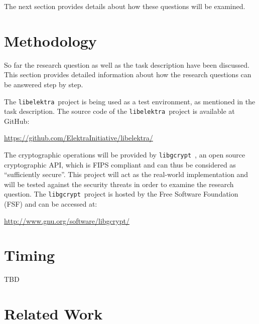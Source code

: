 \documentclass[a4paper,12pt]{article}
\newcommand{\libelektra}{\texttt{libelektra}~}
\newcommand{\libgcrypt}{\texttt{libgcrypt}~}
\begin{document}
The next section provides details about how these questions will be examined.


\section{Methodology}

So far the research question as well as the task description have been discussed.
This section provides detailed information about how the research questions can be answered step by step.

The \libelektra project is being used as a test environment, as mentioned in the task description.
The source code of the \libelektra project is available at GitHub:

\url{https://github.com/ElektraInitiative/libelektra/}

The cryptographic operations will be provided by \libgcrypt, an open source cryptographic API, which is FIPS compliant and can thus be considered as ``sufficiently secure''.
This project will act as the real-world implementation and will be tested against the security threats in order to examine the research question.
The \libgcrypt project is hosted by the Free Software Foundation (FSF) and can be accessed at:

\url{http://www.gnu.org/software/libgcrypt/}



\section{Timing}
TBD
  

\section{Related Work}

\begingroup
\renewcommand{\section}[2]{}
\renewcommand{\refname}{}
\nocite{*}


\endgroup
\end{document}
